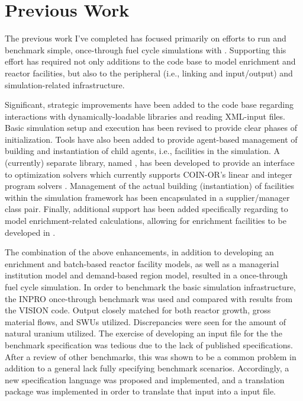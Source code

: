 \chapter{Previous Work}\label{ch:prevwork}

The previous work I've completed has focused primarily on efforts to run and
benchmark simple, once-through fuel cycle simulations with \Cyclus. Supporting
this effort has required not only additions to the \Cyclus code base to model
enrichment and reactor facilities, but also to the peripheral (i.e., linking
and input/output) and simulation-related infrastructure.

Significant, strategic improvements have been added to the \Cyclus code base
regarding interactions with dynamically-loadable libraries and reading XML-input
files. Basic simulation setup and execution has been revised to provide clear
phases of initialization. Tools have also been added to provide agent-based
management of building and instantiation of child agents, i.e., facilities in the
\Cyclus simulation. A (currently) separate library, named \Cyclopts, has been
developed to provide an interface to optimization solvers which currently
supports COIN-OR's linear and integer program solvers
\cite{lougee_common_2003}. Management of the actual building (instantiation) of
facilities within the simulation framework has been encapsulated in a
supplier/manager class pair. Finally, additional support has been added
specifically regarding to model enrichment-related calculations, allowing for
enrichment facilities to be developed in \Cycamore.

The combination of the above enhancements, in addition to developing an
enrichment and batch-based reactor facility models, as well as a managerial
institution model and demand-based region model, resulted in a \Cyclus
once-through fuel cycle simulation. In order to benchmark the basic simulation
infrastructure, the INPRO \cite{_international_2009} once-through benchmark was
used and compared with results from the VISION \cite{yacout_vision_2006}
code. Output closely matched for both reactor growth, gross material flows, and
SWUs utilized. Discrepancies were seen for the amount of natural uranium
utilized. The exercise of developing an input file for the the benchmark
specification was tedious due to the lack of published specifications. After a
review of other benchmarks, this was shown to be a common problem in addition to
a general lack fully specifying benchmark scenarios. Accordingly, a new
specification language was proposed and implemented, and a translation package
was implemented in order to translate that input into a \Cyclus input file.

